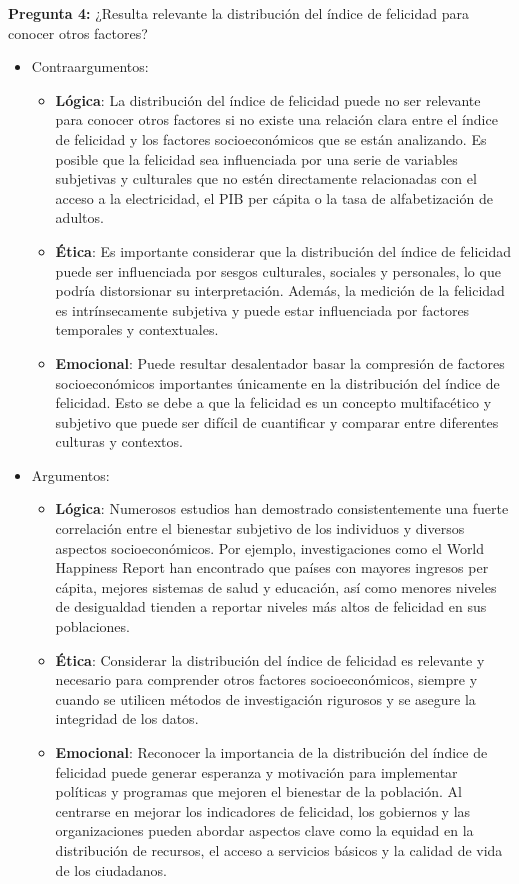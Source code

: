 \documentclass[12pt,oneside,letterpaper,spanish]{article}
\begin{document}
\newpage
\textbf{Pregunta 4:} ¿Resulta relevante la distribución del índice de felicidad para conocer otros factores?
\begin{itemize}
    \item Contraargumentos:
    \begin{itemize}
        \item \textbf{Lógica}: La distribución del índice de felicidad puede no ser relevante para conocer otros factores si no existe una relación clara entre el índice de felicidad y los factores socioeconómicos que se están analizando. Es posible que la felicidad sea influenciada por una serie de variables subjetivas y culturales que no estén directamente relacionadas con el acceso a la electricidad, el PIB per cápita o la tasa de alfabetización de adultos. 
        \item \textbf{Ética}: Es importante considerar que la distribución del índice de felicidad puede ser influenciada por sesgos culturales, sociales y personales, lo que podría distorsionar su interpretación. Además, la medición de la felicidad es intrínsecamente subjetiva y puede estar influenciada por factores temporales y contextuales.
        \item \textbf{Emocional}: Puede resultar desalentador basar la compresión de factores socioeconómicos importantes únicamente en la distribución del índice de felicidad. Esto se debe a que la felicidad es un concepto multifacético y subjetivo que puede ser difícil de cuantificar y comparar entre diferentes culturas y contextos.
    \end{itemize}
    \item Argumentos:
    \begin{itemize}
        \item \textbf{Lógica}: Numerosos estudios han demostrado consistentemente una fuerte correlación entre el bienestar subjetivo de los individuos y diversos aspectos socioeconómicos. Por ejemplo, investigaciones como el World Happiness Report han encontrado que países con mayores ingresos per cápita, mejores sistemas de salud y educación, así como menores niveles de desigualdad tienden a reportar niveles más altos de felicidad en sus poblaciones.
        \item \textbf{Ética}: Considerar la distribución del índice de felicidad es relevante y necesario para comprender otros factores socioeconómicos, siempre y cuando se utilicen métodos de investigación rigurosos y se asegure la integridad de los datos. 
        \item \textbf{Emocional}: Reconocer la importancia de la distribución del índice de felicidad puede generar esperanza y motivación para implementar políticas y programas que mejoren el bienestar de la población. Al centrarse en mejorar los indicadores de felicidad, los gobiernos y las organizaciones pueden abordar aspectos clave como la equidad en la distribución de recursos, el acceso a servicios básicos y la calidad de vida de los ciudadanos. 

\end{itemize}
\end{itemize}
\end{document}
